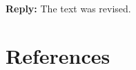 \documentclass[10pt]{iopart}
\begin{document}
\noindent
\textcolor[rgb]{0.51,0.00,0.00}{\textbf{Reply:}}
The text was revised.


\section*{References}



\end{document}
